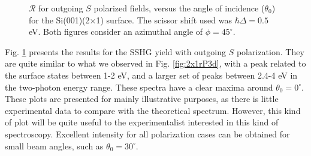 \begin{figure}[t]
\centering
{}\hfill
{}
\caption[Overview of the angular dependence of $\mathcal{R}_{\mathrm{iS}}$.]
{$\mathcal{R}$ for outgoing $S$ polarized fields, versus the angle of
incidence ($\theta_{0}$) for the Si(001)(2$\times$1) surface. The scissor shift
used was $\hbar\Delta = 0.5$ eV. Both figures consider an azimuthal angle of
$\phi = 45^{\circ}$.}
\label{fig:2x1rS3d}
\end{figure}

Fig. \ref{fig:2x1rS3d} presents the results for the SSHG yield with outgoing $S$
polarization. They are quite similar to what we observed in Fig.
\ref{fig:2x1rP3d}, with a peak related to the surface states between 1-2 eV, and
a larger set of peaks between 2.4-4 eV in the two-photon energy range. These
spectra have a clear maxima around $\theta_{0} = 0^{\circ}$. These plots are
presented for mainly illustrative purposes, as there is little experimental data
to compare with the theoretical spectrum. However, this kind of plot will be
quite useful to the experimentalist interested in this kind of spectroscopy.
Excellent intensity for all polarization cases can be obtained for small beam
angles, such as $\theta_{0} = 30^{\circ}$.


